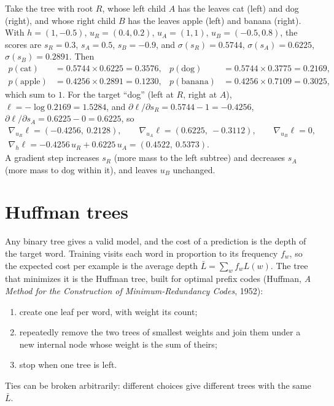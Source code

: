 \begin{notechapter}
\begin{example}\label{hierarchical-softmax:ex:four}
Take the tree with root $R$, whose left child $A$ has the leaves cat (left) and dog (right), and whose right
child $B$ has the leaves apple (left) and banana (right). With $h = (1, -0.5)$, $u_R = (0.4, 0.2)$, $u_A = (1, 1)$, $u_B = (-0.5, 0.8)$,
the scores are $s_R = 0.3$, $s_A = 0.5$, $s_B = -0.9$, and $\sigma(s_R) = 0.5744$, $\sigma(s_A) = 0.6225$, $\sigma(s_B) = 0.2891$. Then
\begin{align*}
  p(\text{cat}) &= 0.5744\times0.6225 = 0.3576, & p(\text{dog}) &= 0.5744\times0.3775 = 0.2169,\\
  p(\text{apple}) &= 0.4256\times0.2891 = 0.1230, & p(\text{banana}) &= 0.4256\times0.7109 = 0.3025,
\end{align*}
which sum to $1$. For the target ``dog'' (left at $R$, right at $A$), $\ell = -\log0.2169 = 1.5284$, and
$\partial\ell/\partial s_R = 0.5744 - 1 = -0.4256$, $\partial\ell/\partial s_A = 0.6225 - 0 = 0.6225$, so
\begin{gather*}
  \nabla_{u_R}\ell = (-0.4256,\ 0.2128),\qquad\nabla_{u_A}\ell = (0.6225,\ -0.3112),\qquad\nabla_{u_B}\ell = 0,\\
  \nabla_h\ell = -0.4256\,u_R + 0.6225\,u_A = (0.4522,\ 0.5373) .
\end{gather*}
A gradient step increases $s_R$ (more mass to the left subtree) and decreases $s_A$ (more mass to dog
within it), and leaves $u_B$ unchanged.
\end{example}

\section{Huffman trees}\label{hierarchical-softmax:sec:huffman}

Any binary tree gives a valid model, and the cost of a prediction is the depth of the target
word. Training visits each word in proportion to its frequency $f_w$, so the expected cost per
example is the average depth $\bar L = \sum_wf_wL(w)$. The tree that minimizes it is the Huffman tree, built
for optimal prefix codes (Huffman, \emph{A Method for the Construction of Minimum-Redundancy
Codes}, 1952):
\begin{enumerate}[nosep]
  \item create one leaf per word, with weight its count;
  \item repeatedly remove the two trees of smallest weights and join them under a new
        internal node whose weight is the sum of theirs;
  \item stop when one tree is left.
\end{enumerate}
Ties can be broken arbitrarily: different choices give different trees with the same $\bar L$.


\end{notechapter}
